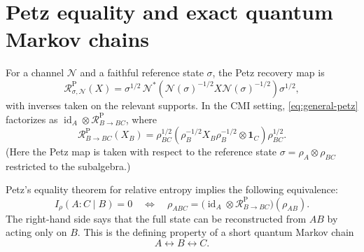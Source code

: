 \documentclass[11pt]{article}
\theoremstyle{accenttheorem}
\theoremstyle{definition}
\newcommand{\cR}{\mathcal{R}}
\newcommand{\id}{\operatorname{id}}
\newcommand{\Tr}{\operatorname{Tr}}
\newcommand{\CMI}{I}
\newcommand{\1}{\mathbf{1}}
\begin{document}
\begin{center}
\end{center}

\section{Petz equality and exact quantum Markov chains}

For a channel \(\mathcal N\) and a faithful reference state \(\sigma\), the Petz recovery map is
\begin{equation}\label{eq:general-petz}
 \cR^{\mathrm P}_{\sigma,\mathcal N}(X)
 =\sigma^{1/2}\,
   \mathcal N^*\!\left(
       \mathcal N(\sigma)^{-1/2}X\mathcal N(\sigma)^{-1/2}
   \right)\sigma^{1/2},
\end{equation}
with inverses taken on the relevant supports.  In the CMI setting, \eqref{eq:general-petz} factorizes as
\(\id_A\otimes\cR^{\mathrm P}_{B\to BC}\), where
\begin{equation}\label{eq:petz-B}
 \cR^{\mathrm P}_{B\to BC}(X_B)
 =\rho_{BC}^{1/2}
   \left(
      \rho_B^{-1/2}X_B\rho_B^{-1/2}\otimes\1_C
   \right)
   \rho_{BC}^{1/2}.
\end{equation}
(Here the Petz map is taken with respect to the reference state \(\sigma=\rho_A\otimes\rho_{BC}\) restricted to the subalgebra.)

Petz's equality theorem for relative entropy implies the following equivalence:
\begin{equation}\label{eq:markov-equivalence}
 \CMI_\rho(A:C\mid B)=0
 \quad\Longleftrightarrow\quad
 \rho_{ABC}
 =\bigl(\id_A\otimes\cR^{\mathrm P}_{B\to BC}\bigr)(\rho_{AB}).
\end{equation}
The right-hand side says that the full state can be reconstructed from \(AB\) by acting only on \(B\).  This is the defining property of a short quantum Markov chain
\[
 A\longleftrightarrow B\longleftrightarrow C.
\]
\end{document}

